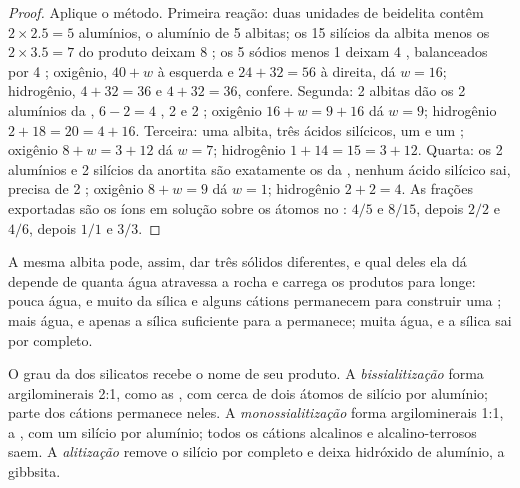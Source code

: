 \begin{proof}
Aplique o método. Primeira reação: duas unidades de beidelita contêm $2\times2.5 = 5$ alumínios, o alumínio de 5 albitas; os 15 silícios da albita menos os $2\times3.5 = 7$ do produto deixam 8 ; os 5 sódios menos 1 deixam
4 , balanceados por 4 ; oxigênio, $40 + w$ à esquerda e $24 + 32 =
56$ à direita, dá $w = 16$; hidrogênio, $4 + 32 = 36$ e $4 + 32 = 36$,
confere. Segunda: 2 albitas dão os 2 alumínios da , $6 - 2 = 4$
, 2  e 2 ; oxigênio $16 + w = 9 + 16$ dá $w = 9$;
hidrogênio $2 + 18 = 20 = 4 + 16$. Terceira: uma albita, três ácidos silícicos, um
 e um ; oxigênio $8 + w = 3 + 12$ dá $w = 7$; hidrogênio
$1 + 14 = 15 = 3 + 12$. Quarta: os 2 alumínios e 2 silícios da anortita são
exatamente os da , nenhum ácido silícico sai,  precisa de 2 ;
oxigênio $8 + w = 9$ dá $w = 1$; hidrogênio $2 + 2 = 4$. As frações exportadas são os íons em solução sobre os átomos no : $4/5$ e $8/15$, depois $2/2$ e $4/6$, depois $1/1$ e $3/3$.
\end{proof}

A mesma albita pode, assim, dar três sólidos diferentes, e qual deles ela dá depende de quanta água atravessa a rocha e carrega os produtos para longe: pouca água, e muito da sílica e alguns cátions permanecem para construir uma ; mais água, e apenas a sílica suficiente para a  permanece; muita água, e a sílica sai por completo.

\begin{definition}\label{def:b1:weathering-clays:hydrolysis-degree}
O grau da  dos silicatos recebe o nome de seu produto. A \emph{bissialitização} forma argilominerais 2:1, como as , com cerca de dois átomos de silício por alumínio; parte dos cátions permanece neles. A \emph{monossialitização} forma argilominerais 1:1, a , com um silício por alumínio; todos os cátions alcalinos e alcalino-terrosos saem. A \emph{alitização} remove o silício por completo e deixa hidróxido de alumínio, a gibbsita.
\end{definition}

